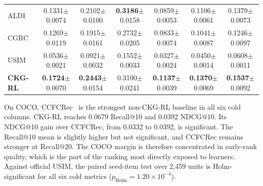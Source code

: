 \documentclass[sigconf,anonymous,review]{acmart}
\newcommand{\sd}[1]{{\footnotesize$\pm$#1}}
\newcommand{\sigmark}[1]{\rlap{\textsuperscript{\scriptsize #1}}}
\begin{document}
\begin{table}[t]
\begin{tabular*}{\textwidth}{@{\extracolsep{\fill}}lcccccc}
ALDI~\cite{huang2023aldi} & 0.1331\sd{0.0074} & 0.2102\sd{0.0100} & \textbf{0.3186}\sd{0.0158} & 0.0859\sd{0.0053} & 0.1106\sd{0.0061} & 0.1379\sd{0.0073} \\
CGRC~\cite{kim2024cgrc} & 0.1269\sd{0.0119} & 0.1915\sd{0.0161} & 0.2732\sd{0.0205} & 0.0833\sd{0.0074} & 0.1041\sd{0.0087} & 0.1246\sd{0.0097} \\
USIM~\cite{zhao2024usim} & 0.0536\sd{0.0021} & 0.0921\sd{0.0032} & 0.1552\sd{0.0033} & 0.0327\sd{0.0024} & 0.0450\sd{0.0014} & 0.0608\sd{0.0011} \\
\textbf{CKG-RL}\sigmark{$\dagger$} & \textbf{0.1724}\sd{0.0070}\sigmark{*} & \textbf{0.2443}\sd{0.0154}\sigmark{*} & 0.3100\sd{0.0241}\sigmark{*} & \textbf{0.1137}\sd{0.0039}\sigmark{*} & \textbf{0.1370}\sd{0.0069}\sigmark{*} & \textbf{0.1537}\sd{0.0092}\sigmark{*} \\
\bottomrule
\end{tabular*}
\end{table}

On COCO, CCFCRec~\cite{zhou2023ccfcrec} is the strongest non-CKG-RL baseline in all six cold columns. CKG-RL reaches 0.0679 Recall@10 and 0.0392 NDCG@10. Its NDCG@10 gain over CCFCRec, from 0.0332 to 0.0392, is significant. The Recall@10 mean is slightly higher but not significant, and CCFCRec remains stronger at Recall@20. The COCO margin is therefore concentrated in early-rank quality, which is the part of the ranking most directly exposed to learners. Against official USIM, the paired seed-item test over 2,459 units is Holm-significant for all six cold metrics (\(p_{\mathrm{Holm}}=1.20{\times}10^{-4}\)).
\end{document}
